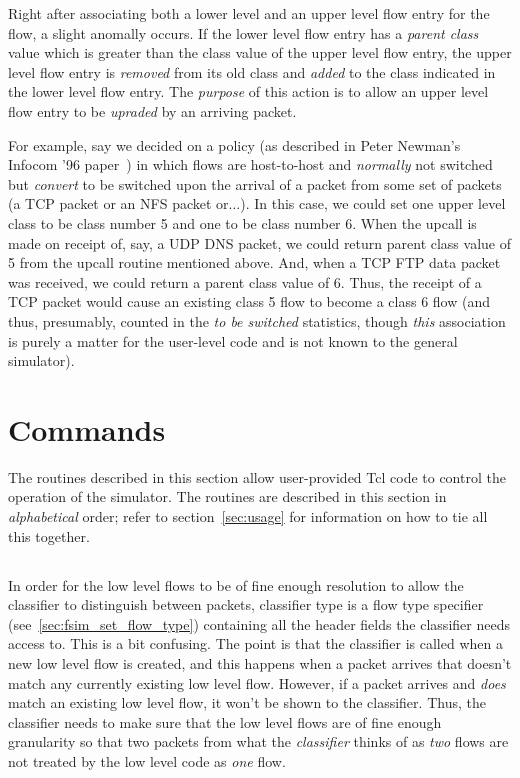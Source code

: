 \documentclass{article}
\begin{document}
Right after associating both a lower level and an upper level flow
entry for the flow, a slight anomally occurs.  If the lower level flow
entry has a \emph{parent class} value which is greater than the class
value of the upper level flow entry, the upper level flow entry is
\emph{removed} from its old class and \emph{added} to the class
indicated in the lower level flow entry.  The \emph{purpose} of this
action is to allow an upper level flow entry to be \emph{upraded} by an
arriving packet.

For example, say we decided on a policy (as described
in Peter Newman's Infocom '96 paper~\cite{xxx}) in which flows are
host-to-host and \emph{normally} not switched but \emph{convert} to be
switched upon the arrival of a packet from some set of packets (a TCP
packet or an NFS packet or...).  In this case, we could set one upper
level class to be class number 5 and one to be class number 6.  When
the upcall is made on receipt of, say, a UDP DNS packet, we could
return parent class value of 5 from the upcall routine mentioned above.
And, when a TCP FTP data packet was received, we could return a parent
class value of 6.  Thus, the receipt of a TCP packet would cause an
existing class 5 flow to become a class 6 flow (and thus, presumably,
counted in the \emph{to be switched} statistics, though \emph{this}
association is purely a matter for the user-level code and is not known
to the general simulator).

\section{Commands}
The routines described in this section allow user-provided Tcl code to
control the operation of the simulator.  The routines are described in
this section in \emph{alphabetical} order; refer to
section~\ref{sec:usage} for information on how to tie all this
together.

\subsection{}

In order for the low level flows to be of fine
enough resolution to allow the classifier to distinguish between
packets, classifier type is a flow type specifier
(see~\ref{sec:fsim_set_flow_type}) containing all the header fields the
classifier needs access to.  This is a bit confusing.  The point is
that the classifier is called when a new low level flow is created, and
this happens when a packet arrives that doesn't match any currently
existing low level flow.  However, if a packet arrives and \emph{does}
match an existing low level flow, it won't be shown to the classifier.
Thus, the classifier needs to make sure that the low level flows are
of fine enough granularity so that two packets from what the
\emph{classifier} thinks of as \emph{two} flows are not treated by the
low level code as \emph{one} flow.
\end{document}
